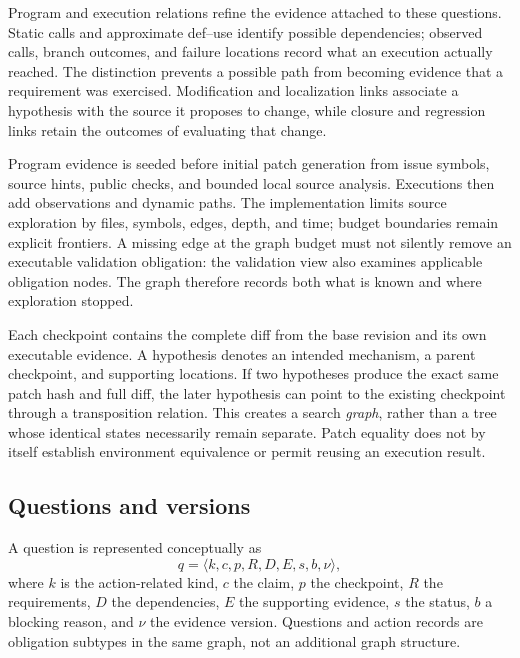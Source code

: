 \documentclass[acmsmall,screen,review,anonymous]{acmart}
\begin{document}
Program and execution relations refine the evidence attached to these questions. Static calls and approximate def--use identify possible dependencies; observed calls, branch outcomes, and failure locations record what an execution actually reached. The distinction prevents a possible path from becoming evidence that a requirement was exercised. Modification and localization links associate a hypothesis with the source it proposes to change, while closure and regression links retain the outcomes of evaluating that change.

Program evidence is seeded before initial patch generation from issue symbols, source hints, public checks, and bounded local source analysis. Executions then add observations and dynamic paths. The implementation limits source exploration by files, symbols, edges, depth, and time; budget boundaries remain explicit frontiers. A missing edge at the graph budget must not silently remove an executable validation obligation: the validation view also examines applicable obligation nodes. The graph therefore records both what is known and where exploration stopped.

Each checkpoint contains the complete diff from the base revision and its own executable evidence. A hypothesis denotes an intended mechanism, a parent checkpoint, and supporting locations. If two hypotheses produce the exact same patch hash and full diff, the later hypothesis can point to the existing checkpoint through a transposition relation. This creates a search \emph{graph}, rather than a tree whose identical states necessarily remain separate. Patch equality does not by itself establish environment equivalence or permit reusing an execution result.

\subsection{Questions and versions}
A question is represented conceptually as
\begin{equation}
 q=\langle k,c,p,R,D,E,s,b,\nu\rangle,
\end{equation}
where $k$ is the action-related kind, $c$ the claim, $p$ the checkpoint, $R$ the requirements, $D$ the dependencies, $E$ the supporting evidence, $s$ the status, $b$ a blocking reason, and $\nu$ the evidence version. Questions and action records are obligation subtypes in the same graph, not an additional graph structure.
\end{document}
